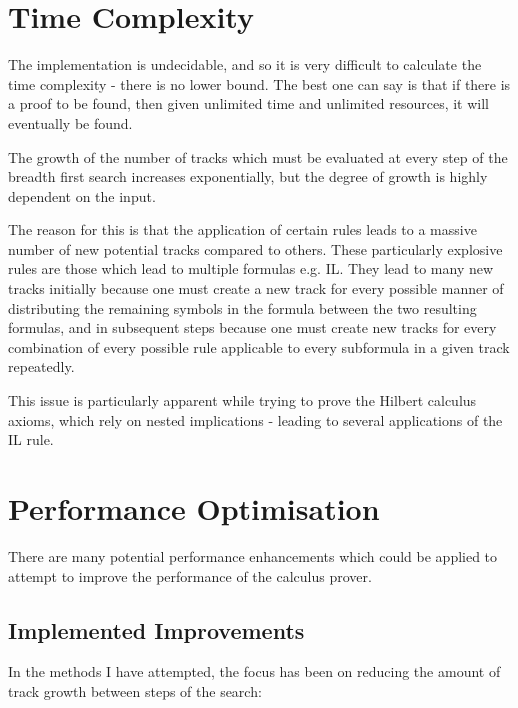 \documentclass{article}
\begin{document}
\section{Time Complexity}

The implementation is undecidable, and so it is very difficult to calculate the
time complexity - there is no lower bound. The best one
can say is that if there is a proof to be found, then given unlimited time and
unlimited resources, it will eventually be found.

The growth of the number of tracks which must be evaluated at every step of the 
breadth first search increases exponentially, but the degree of growth is highly 
dependent on the input. 

The reason for this is that the application of certain rules leads to a massive
number of new potential tracks compared to others. These particularly explosive
rules are those which lead to multiple formulas e.g. IL. They lead to many new
tracks initially because one must create a new track for every possible manner
of distributing the remaining symbols in the formula between the two resulting
formulas, and in subsequent steps because one must create new tracks for every
combination of every possible rule applicable to every subformula in a given
track repeatedly.

This issue is particularly apparent while trying to prove the Hilbert calculus
axioms, which rely on nested implications - leading to several applications of
the IL rule.

\section{Performance Optimisation}

There are many potential performance enhancements which could be
applied to attempt to improve the performance of the calculus prover. 

\subsection{Implemented Improvements}

In the
methods I have attempted, the focus has been on reducing the amount of track
growth between steps of the search:
\end{document}
